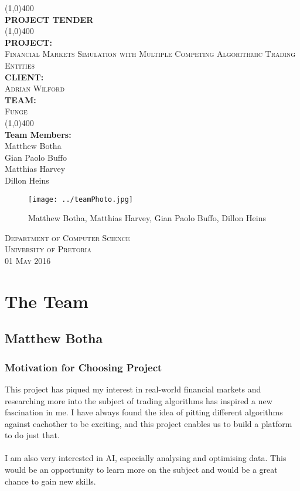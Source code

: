 \documentclass{article}
\begin{document}
\begin{titlepage}
	\begin{center}
		\line(1,0){400}\\
		[6mm]
		\huge{\bfseries PROJECT TENDER}\\
		[2mm]
		\line(1,0){400}\\
		[5mm]
		\large\textbf{PROJECT:}\\\textsc{Financial Markets Simulation with Multiple Competing Algorithmic Trading Entities}\\
		[3mm]
		\large\textbf{CLIENT:}\\\textsc{Adrian Wilford}\\
		[3mm]
		\large \textbf{TEAM:}\\\textsc{Funge}\\
		\line(1,0){400}\\
		[5mm]
		\large \textbf{Team Members:}\\
		[3mm]
		\large Matthew Botha\\
		\large Gian Paolo Buffo\\
		\large Matthias Harvey\\
        \large Dillon Heins\\[3mm]
		\begin{figure}[H]
			\centering
			\texttt{[image: ../teamPhoto.jpg]}
			\caption{Matthew Botha, Matthias Harvey, Gian Paolo Buffo, Dillon Heins}
		\end{figure}
    \end{center}

    \begin{flushright}
        \textsc{\large Department of Computer Science\\
        University of Pretoria\\
        01 May 2016\\}
    \end{flushright}
\end{titlepage}

\section{The Team}
	\subsection{Matthew Botha}
		
		\subsubsection{Motivation for Choosing Project}
			This project has piqued my interest in real-world financial markets and researching more into the subject of trading algorithms has inspired a new fascination in me.	I have always found the idea of pitting different algorithms against eachother to be exciting, and this project enables us to build a platform to do just that.
			\\\\
			I am also very interested in AI, especially analysing and optimising data. This would be an opportunity to learn more on the subject and would be a great chance to gain new skills.
			
\end{document}
